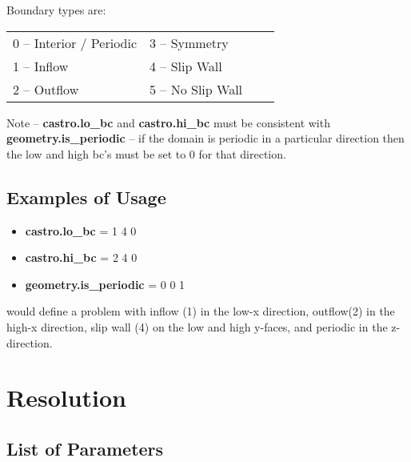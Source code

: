 Boundary types are:

\begin{table*}[h]
\begin{center}
\begin{tabular}{llll} 
0 --  Interior / Periodic \hspace{1.in} & 3  --  Symmetry     \hspace{1.in} & \\
1 --  Inflow              \hspace{1.in} & 4  --  Slip Wall    \hspace{1.in}& \\
2 --  Outflow             \hspace{1.in} & 5  --  No Slip Wall \hspace{1.in}& \\
\end{tabular}
\end{center}
\end{table*}

\noindent Note -- {\bf castro.lo\_bc} and {\bf castro.hi\_bc} must be consistent with 
{\bf geometry.is\_periodic} -- if the domain is periodic in a particular
direction then the low and high bc's must be set to 0 for that direction.

\subsection{Examples of Usage}

\begin{itemize}

\item {\bf castro.lo\_bc} = 1 4 0 

\item {\bf castro.hi\_bc} = 2 4 0 

\item {\bf geometry.is\_periodic} = 0 0 1

\end{itemize}

\noindent would define a problem with inflow (1) in the low-x direction, 
outflow(2) in the high-x direction, slip wall (4) on the low and high y-faces, 
and periodic in the z-direction. 

\section{Resolution}
\subsection{List of Parameters}

